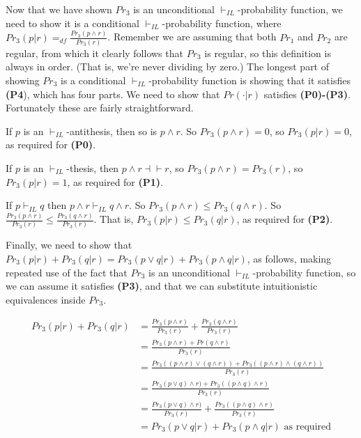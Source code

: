 \noindent Now that we have shown $Pr_3$ is an unconditional $\vdash_{IL}$-probability function, we need to show it is a conditional $\vdash_{IL}$-probability function, where $Pr_3(p | r) =_{df} \frac{Pr_3(p \wedge r)}{Pr_3(r)}$. Remember we are assuming that both $Pr_1$ and $Pr_2$ are regular, from which it clearly follows that $Pr_3$ is regular, so this definition is always in order. (That is, we're never dividing by zero.) The longest part of showing $Pr_3$ is a conditional $\vdash_{IL}$-probability function is showing that it satisfies \textbf{(P4}), which has four parts. We need to show that $Pr(\cdot | r)$ satisfies \textbf{(P0)-(P3)}. Fortunately these are fairly straightforward.

If $p$ is an $\vdash_{IL}$-antithesis, then so is $p \wedge r$. So $Pr_3(p \wedge r) =  0$, so $Pr_3(p | r) = 0$, as required for \textbf{(P0)}.

If $p$ is an $\vdash_{IL}$-thesis, then $p \wedge r \dashv \vdash r$, so $Pr_3(p \wedge r) = Pr_3(r)$, so $Pr_3(p | r) = 1$, as required for \textbf{(P1)}.

If $p \vdash_{IL} q$ then $p \wedge r \vdash_{IL} q \wedge r$. So $Pr_3(p \wedge r) \leq Pr_3(q \wedge r)$. So $\frac{Pr_3(p \wedge r)}{Pr_3(r)} \leq \frac{Pr_3(q \wedge r)}{Pr_3(r)}$. That is, $Pr_3(p | r) \leq Pr_3(q | r)$, as required for \textbf{(P2)}.

Finally, we need to show that $Pr_3(p | r) + Pr_3(q | r) = Pr_3(p \vee q | r) + Pr_3(p \wedge q | r)$, as follows, making repeated use of the fact that $Pr_3$ is an unconditional $\vdash_{IL}$-probability function, so we can assume it satisfies \textbf{(P3)}, and that we can substitute intuitionistic equivalences inside $Pr_3$.

\begin{align}
Pr_3(p | r) + Pr_3(q | r) &= \frac{Pr_3(p \wedge r)}{Pr_3(r)} + \frac{Pr_3(q \wedge r)}{Pr_3(r)} \\
&= \frac{Pr_3(p \wedge r) + Pr(q \wedge r)}{Pr_3(r)} \\
&= \frac{Pr_3((p \wedge r) \vee (q \wedge r)) + Pr_3((p \wedge r) \wedge (q \wedge r))}{Pr_3(r)} \\
&=\frac{Pr_3(p \vee q) \wedge r) + Pr_3((p \wedge q) \wedge r)}{Pr_3(r)} \\
&=\frac{Pr_3(p \vee q) \wedge r)}{Pr_3(r)} + \frac{Pr_3((p \wedge q) \wedge r)}{Pr_3(r)} \\
&=Pr_3(p \vee q | r) + Pr_3(p \wedge q | r) \text{ as required}
\end{align}

